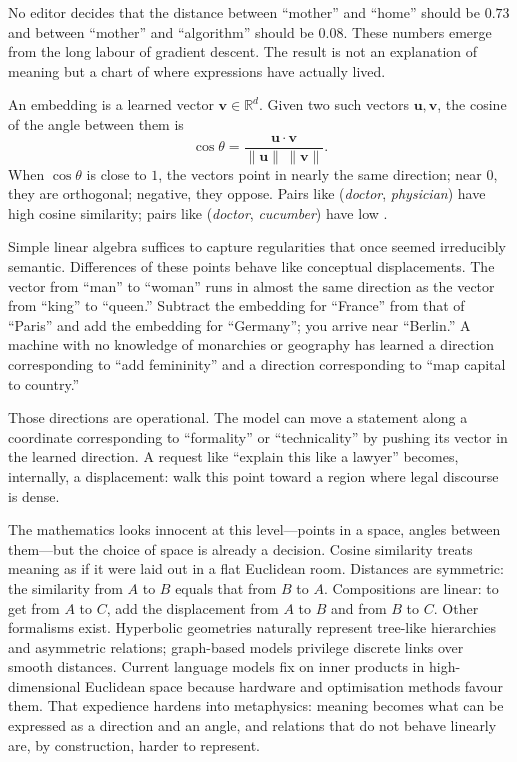 \documentclass[12pt,a4paper]{article}
\begin{document}
No editor decides that the distance between ``mother'' and ``home'' should be $0.73$ and between ``mother'' and ``algorithm'' should be $0.08$. These numbers emerge from the long labour of gradient descent. The result is not an explanation of meaning but a chart of where expressions have actually lived.

\begin{formalbox}[title={Angles as Similarity}]
An embedding is a learned vector $\mathbf{v} \in \mathbb{R}^d$. Given two such vectors $\mathbf{u}, \mathbf{v}$, the cosine of the angle between them is
\[
\cos\theta = \frac{\mathbf{u}\cdot\mathbf{v}}{\|\mathbf{u}\|\,\|\mathbf{v}\|}.
\]
When $\cos\theta$ is close to $1$, the vectors point in nearly the same direction; near $0$, they are orthogonal; negative, they oppose. Pairs like (\textit{doctor}, \textit{physician}) have high cosine similarity; pairs like (\textit{doctor}, \textit{cucumber}) have low \cite{mikolov2013efficient}.
\end{formalbox}

Simple linear algebra suffices to capture regularities that once seemed irreducibly semantic. Differences of these points behave like conceptual displacements. The vector from ``man'' to ``woman'' runs in almost the same direction as the vector from ``king'' to ``queen.'' Subtract the embedding for ``France'' from that of ``Paris'' and add the embedding for ``Germany''; you arrive near ``Berlin.'' A machine with no knowledge of monarchies or geography has learned a direction corresponding to ``add femininity'' and a direction corresponding to ``map capital to country.''

Those directions are operational. The model can move a statement along a coordinate corresponding to ``formality'' or ``technicality'' by pushing its vector in the learned direction. A request like ``explain this like a lawyer'' becomes, internally, a displacement: walk this point toward a region where legal discourse is dense.

The mathematics looks innocent at this level---points in a space, angles between them---but the choice of space is already a decision. Cosine similarity treats meaning as if it were laid out in a flat Euclidean room. Distances are symmetric: the similarity from $A$ to $B$ equals that from $B$ to $A$. Compositions are linear: to get from $A$ to $C$, add the displacement from $A$ to $B$ and from $B$ to $C$. Other formalisms exist. Hyperbolic geometries naturally represent tree-like hierarchies and asymmetric relations; graph-based models privilege discrete links over smooth distances. Current language models fix on inner products in high-dimensional Euclidean space because hardware and optimisation methods favour them. That expedience hardens into metaphysics: meaning becomes what can be expressed as a direction and an angle, and relations that do not behave linearly are, by construction, harder to represent.
\end{document}
